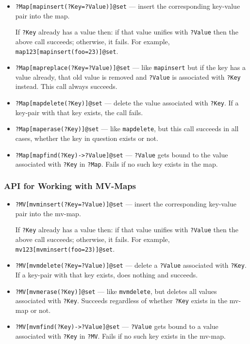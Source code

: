 \begin{itemize}
\item  \texttt{?Map[mapinsert(?Key=?Value)]@\bs{}set} --- insert the
  corresponding key-value pair into the map. 

  If \texttt{?Key} already has a value then: if that value unifies with
  \texttt{?Value} then the above call succeeds; otherwise, it fails.
  For example, \texttt{map123[mapinsert(foo=23)]@\bs{}set}. 
\item \texttt{?Map[mapreplace(?Key=?Value)]@\bs{}set} --- like
  \texttt{mapinsert} but if the key has a value already,
  that old value is removed and \texttt{?Value} is associated with
  \texttt{?Key} instead. This call always succeeds.
\item \texttt{?Map[mapdelete(?Key)]@\bs{}set} --- delete the value
  associated with \texttt{?Key}. If a key-pair with that key exists,
  the call fails.
\item \texttt{?Map[maperase(?Key)]@\bs{}set} --- like \texttt{mapdelete}, but
  this call succeeds in all cases, whether the key in question exists or
  not.
\item \texttt{?Map[mapfind(?Key)->?Value]@\bs{}set} --- \texttt{?Value}
  gets bound to the value associated with \texttt{?Key} in \texttt{?Map}.
  Fails if no such key exists in the map.
\end{itemize}

\subsubsection{API for Working with MV-Maps} \label{sec-api-mvmap}

\begin{itemize}
\item  \texttt{?MV[mvminsert(?Key=?Value)]@\bs{}set} --- insert the
  corresponding key-value pair into the mv-map. 

  If \texttt{?Key} already has a value then: if that value unifies with
  \texttt{?Value} then the above call succeeds; otherwise, it fails.
  For example, \texttt{mv123[mvminsert(foo=23)]@\bs{}set}. 
\item \texttt{?MV[mvmdelete(?Key=?Value)]@\bs{}set} --- delete a
  \texttt{?Value} 
  associated with \texttt{?Key}. If a key-pair with that key exists,
  does nothing and succeeds.
\item \texttt{?MV[mvmerase(?Key)]@\bs{}set} --- like \texttt{mvmdelete},  but
  deletes all values associated with \texttt{?Key}. Succeeds regardless
  of whether \texttt{?Key} exists in the mv-map or not.
\item \texttt{?MV[mvmfind(?Key)->?Value]@\bs{}set} --- \texttt{?Value}
  gets bound to a value associated with \texttt{?Key} in \texttt{?MV}.
  Fails if no such key exists in the mv-map.
\end{itemize}





